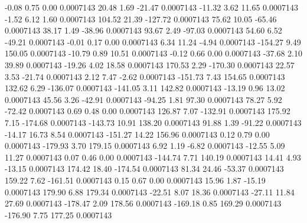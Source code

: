        -0.08        0.75        0.00     0.0007143
       20.48        1.69      -21.47     0.0007143
      -11.32        3.62       11.65     0.0007143
       -1.52        6.12        1.60     0.0007143
      104.52       21.39     -127.72     0.0007143
       75.62       10.05      -65.46     0.0007143
       38.17        1.49      -38.96     0.0007143
       93.67        2.49      -97.03     0.0007143
       54.60        6.52      -49.21     0.0007143
       -0.01        0.17        0.00     0.0007143
        6.34       11.24       -4.94     0.0007143
     -154.27        9.49      150.05     0.0007143
      -10.79        0.89       10.51     0.0007143
       -0.12        0.66        0.00     0.0007143
      -37.68        2.10       39.89     0.0007143
      -19.26        4.02       18.58     0.0007143
      170.53        2.29     -170.30     0.0007143
       22.57        3.53      -21.74     0.0007143
        2.12        7.47       -2.62     0.0007143
     -151.73        7.43      154.65     0.0007143
      132.62        6.29     -136.07     0.0007143
     -141.05        3.11      142.82     0.0007143
      -13.19        0.96       13.02     0.0007143
       45.56        3.26      -42.91     0.0007143
      -94.25        1.81       97.30     0.0007143
       78.27        5.92      -72.42     0.0007143
        0.69        0.48        0.00     0.0007143
      126.87        7.07     -132.91     0.0007143
      175.92        7.15     -174.68     0.0007143
     -143.73       10.91      138.20     0.0007143
       91.88        1.39      -91.22     0.0007143
      -14.17       16.73        8.54     0.0007143
     -151.27       14.22      156.96     0.0007143
        0.12        0.79        0.00     0.0007143
     -179.93        3.70      179.15     0.0007143
        6.92        1.19       -6.82     0.0007143
      -12.55        5.09       11.27     0.0007143
        0.07        0.46        0.00     0.0007143
     -144.74        7.71      140.19     0.0007143
       14.41        4.93      -13.15     0.0007143
      174.42       18.40     -174.54     0.0007143
       81.34       24.46      -53.37     0.0007143
      159.22        7.62     -161.51     0.0007143
        0.15        0.67        0.00     0.0007143
       15.96        1.87      -15.19     0.0007143
      179.90        6.88      179.34     0.0007143
      -22.51        8.07       18.36     0.0007143
      -27.11       11.84       27.69     0.0007143
     -178.47        2.09      178.56     0.0007143
     -169.18        0.85      169.29     0.0007143
     -176.90        7.75      177.25     0.0007143
